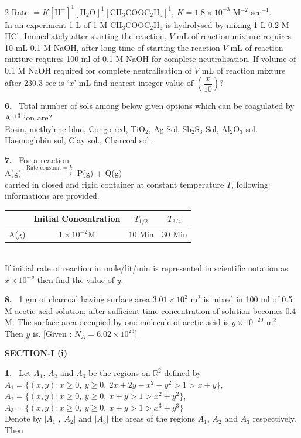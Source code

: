 \documentclass[10pt]{extarticle}
\newcommand{\partsec}[2]{\par\medskip\noindent{\large\bfseries PART-#1: #2}\par\smallskip}
\newcommand{\sect}[1]{\par\smallskip\noindent\textbf{#1}\par}
\newcommand{\qn}[1]{\par\smallskip\noindent\textbf{#1.}~}
\begin{document}
\begin{multicols}{2}
Rate $=K[\mathrm{H^+}]^1[\mathrm{H_2O}]^1[\mathrm{CH_3COOC_2H_5}]^1$, $K=1.8\times10^{-3}$ M$^{-2}$ sec$^{-1}$.\\
In an experiment 1 L of 1 M CH$_3$COOC$_2$H$_5$ is hydrolysed by mixing 1 L 0.2 M HCl. Immediately after starting the reaction, $V$ mL of reaction mixture requires 10 mL 0.1 M NaOH, after long time of starting the reaction $V$ mL of reaction mixture requires 100 ml of 0.1 M NaOH for complete neutralisation. If volume of 0.1 M NaOH required for complete neutralisation of $V$ mL of reaction mixture after 230.3 sec is `$x$' mL find nearest integer value of $\left(\dfrac{x}{10}\right)$?
\qn{6} Total number of sols among below given options which can be coagulated by Al$^{+3}$ ion are?\\
Eosin, methylene blue, Congo red, TiO$_2$, Ag Sol, Sb$_2$S$_3$ Sol, Al$_2$O$_3$ sol. Haemoglobin sol, Clay sol., Charcoal sol.
\qn{7} For a reaction\\
A(g) $\xrightarrow{\text{Rate constant}=k}$ P(g) + Q(g)\\
carried in closed and rigid container at constant temperature $T$, following informations are provided.
\par\nobreak
{\small\setlength{\tabcolsep}{4pt}\renewcommand{\arraystretch}{1.3}
\begin{tabular}{|c|c|c|c|}\hline
 & Initial Concentration & $T_{1/2}$ & $T_{3/4}$\\\hline
A(g) & $1\times10^{-2}$M & 10 Min & 30 Min\\\hline
\end{tabular}}\\
If initial rate of reaction in mole/lit/min is represented in scientific notation as $x\times10^{-y}$ then find the value of $y$.
\qn{8} 1 gm of charcoal having surface area $3.01\times10^2$ m$^2$ is mixed in 100 ml of 0.5 M acetic acid solution; after sufficient time concentration of solution becomes 0.4 M. The surface area occupied by one molecule of acetic acid is $y\times10^{-20}$ m$^2$. Then $y$ is. [Given : $N_A=6.02\times10^{23}$]
\partsec{3}{MATHEMATICS}
\sect{SECTION-I (i)}
\qn{1} Let $A_1$, $A_2$ and $A_3$ be the regions on $\mathbb R^2$ defined by\\
$A_1=\{(x,y):x\ge0,\ y\ge0,\ 2x+2y-x^2-y^2>1>x+y\}$,\\
$A_2=\{(x,y):x\ge0,\ y\ge0,\ x+y>1>x^2+y^2\}$,\\
$A_3=\{(x,y):x\ge0,\ y\ge0,\ x+y>1>x^3+y^3\}$\\
Denote by $|A_1|,|A_2|$ and $|A_3|$ the areas of the regions $A_1$, $A_2$ and $A_3$ respectively. Then

\end{multicols}
\end{document}
